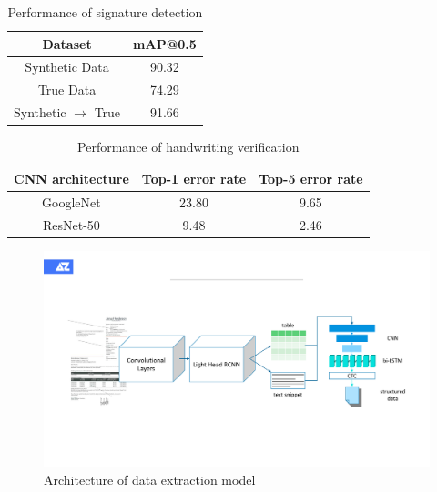 \documentclass[sigconf]{acmart}
\begin{document}
\begin{table}
	\caption{Performance of signature detection}
	\label{signature}
	\centering
	\begin{tabular}{cc}
		\toprule
		\textbf{Dataset} & \textbf{mAP@0.5} \\
		\midrule
		Synthetic Data & 90.32 \\
		True Data & 74.29 \\
		Synthetic $\rightarrow$ True & 91.66 \\
		\bottomrule
	\end{tabular}
\end{table}

\begin{table}
	\caption{Performance of handwriting verification}
	\label{handwriting}
	\centering
	\begin{tabular}{ccc}
		\toprule
		\textbf{CNN architecture} & \textbf{Top-1 error rate} & \textbf{Top-5 error rate}\\
		\midrule
		GoogleNet & 23.80 & 9.65 \\
		ResNet-50 & 9.48 & 2.46 \\
		\bottomrule
	\end{tabular}
\end{table}


\begin{figure}[h]
	\centering
	\includegraphics[width=\linewidth]{figure3}
	\caption{Architecture of data extraction model }
	\label{figure3}
\end{figure}
\end{document}
